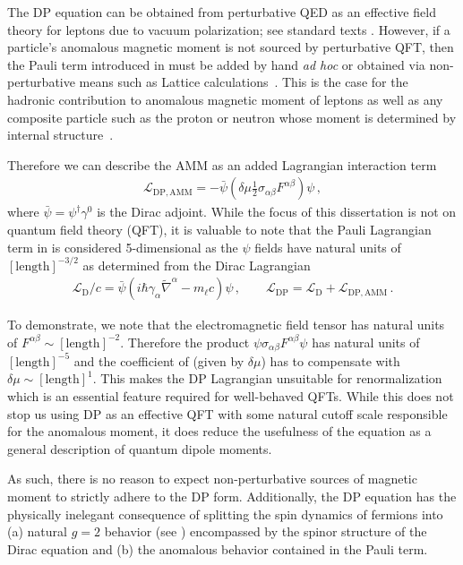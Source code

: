 The DP equation can be obtained from perturbative QED as an effective field theory for leptons due to vacuum polarization; see standard texts \cite{Itzykson:1980rh,Schwartz:2014sze}. However, if a particle's anomalous magnetic moment is not sourced by perturbative QFT, then the Pauli term introduced in  must be added by hand \emph{ad hoc} or obtained via non-perturbative means such as Lattice calculations~\citep{Aoyama:2020ynm}. This is the case for the hadronic contribution to anomalous magnetic moment of leptons as well as any composite particle such as the proton or neutron whose moment is determined by internal structure~\citep{Proceedings:2012ulb,Green:2015wqa}.

Therefore we can describe the AMM as an added Lagrangian interaction term
\begin{gather}
    \label{lamm:1}
    \mathcal{L}_\mathrm{DP,AMM} = -{\bar\psi}\left(\delta\mu\frac{1}{2}\sigma_{\alpha\beta}F^{\alpha\beta}\right)\psi\,,
\end{gather}
where ${\bar\psi}=\psi^{\dagger}\gamma^{0}$ is the Dirac adjoint. While the focus of this dissertation is not on quantum field theory (QFT), it is valuable to note that the Pauli Lagrangian term in  is considered 5-dimensional as the $\psi$ fields have natural units of $[\mathrm{length}]^{-3/2}$ as determined from the Dirac Lagrangian
\begin{gather}
    \label{ld:1}
    \mathcal{L}_\mathrm{D}/c=\bar\psi\left(i\hbar\gamma_{\alpha}\widetilde\nabla^{\alpha}-m_{\ell}c\right)\psi\,,\qquad \mathcal{L}_\mathrm{DP} = \mathcal{L}_\mathrm{D} + \mathcal{L}_\mathrm{DP,AMM}\,.
\end{gather}

To demonstrate, we note that the electromagnetic field tensor has natural units of $F^{\alpha\beta}\sim[\mathrm{length}]^{-2}$. Therefore the product $\psi\sigma_{\alpha\beta}F^{\alpha\beta}\psi$ has natural units of $[\mathrm{length}]^{-5}$ and the coefficient of  (given by $\delta\mu$) has to compensate with $\delta\mu\sim[\mathrm{length}]^{1}$. This makes the DP Lagrangian unsuitable for renormalization which is an essential feature required for well-behaved QFTs. While this does not stop us using DP as an effective QFT with some natural cutoff scale responsible for the anomalous moment, it does reduce the usefulness of the equation as a general description of quantum dipole moments.

As such, there is no reason to expect non-perturbative sources of magnetic moment to strictly adhere to the DP form. Additionally, the DP equation has the physically inelegant consequence of splitting the spin dynamics of fermions into (a) natural $g\!=\!2$ behavior (see ) encompassed by the spinor structure of the Dirac equation and (b) the anomalous behavior contained in the Pauli term.

